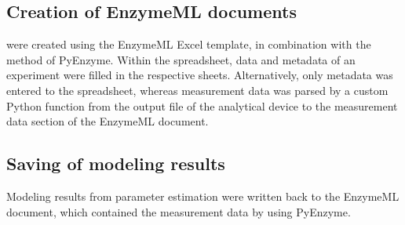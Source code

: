 \documentclass[letterpaper,12pt,english]{jupyterBook}
\begin{document}
\subsection{Creation of EnzymeML documents}
\label{\detokenize{methods:creation-of-enzymeml-documents}}
\sphinxAtStartPar
{} were created using the EnzymeML Excel template, in combination with the  method of PyEnzyme. Within the spreadsheet, data and metadata of an experiment were filled in the respective sheets. Alternatively, only metadata was entered to the spreadsheet, whereas measurement data was parsed by a custom Python function from the output file of the analytical device to the measurement data section of the EnzymeML document.


\subsection{Saving of modeling results}
\label{\detokenize{methods:saving-of-modeling-results}}
\sphinxAtStartPar
Modeling results from parameter estimation were written back to the EnzymeML document, which contained the measurement data by using PyEnzyme.
\end{document}
